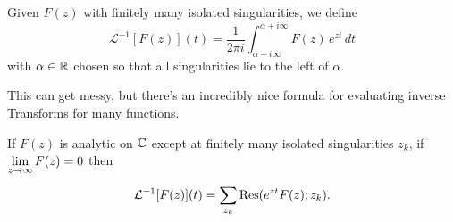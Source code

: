 \documentclass[../m136main.tex]{subfiles}
\begin{document}
\begin{definition}
    Given $F(z)$ with finitely many isolated singularities, we define
    \[ \mathcal L^{-1}[F(z)](t) = \frac{1}{2\pi i} \int_{\alpha - i\infty}^{\alpha + i\infty} F(z) \,e^{zt} \,dt \]
    with $\alpha \in \mathbb{R}$ chosen so that all singularities lie to the left of $\alpha$.
\end{definition}

This can get messy, but there's an incredibly nice formula for evaluating inverse Transforms for many functions.

\begin{theorem}[]
    If $F(z)$ is analytic on $\mathbb{C}$ except at finitely many isolated singularities $z_k$, if $\displaystyle \lim_{z \to \infty} F(z) = 0$ then  \vspace{-6pt}
    \[ \mathcal L^{-1}[F(z)](t) = \sum_{z_k}^{} \operatorname{Res}(e^{zt} F(z); z_k). \]
\end{theorem}
\end{document}
